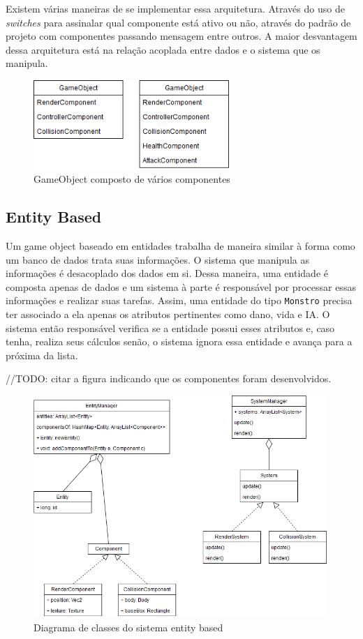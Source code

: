 \documentclass[12pt, 
openright, 
oneside, 
a4paper,    
brazil]{facom-ufu-abntex2}
\begin{document}
Existem várias maneiras de se implementar essa arquitetura. Através do uso de \textit{switches} para assinalar qual componente está ativo ou não, através do padrão de projeto com componentes passando mensagem entre outros. A maior desvantagem dessa arquitetura está na relação acoplada entre  dados e o sistema que os manipula.

\begin{figure}[H]
	\centering
	\includegraphics[width=20em]{imagens/componentBased.png}
	\caption{GameObject composto de vários componentes}
\end{figure}


\subsection{Entity Based}
Um game object baseado em entidades trabalha de maneira similar à forma como um banco de dados trata suas informações. O sistema que manipula as informações é desacoplado dos dados em si. Dessa maneira, uma entidade é composta apenas de dados e um sistema à parte é responsável por processar essas informações e realizar suas tarefas.
Assim, uma entidade do tipo \texttt{Monstro} precisa ter associado a ela apenas os atributos pertinentes como dano, vida e IA. O sistema então responsável verifica se a entidade possui esses atributos e, caso tenha, realiza seus cálculos senão, o sistema ignora essa entidade e avança para a próxima da lista.

//TODO: citar a figura indicando que os componentes foram desenvolvidos.


\begin{figure}[H]
	\centering
	\includegraphics[width=30em]{imagens/entityDiagram.png}
	\caption{Diagrama de classes do sistema entity based}
\end{figure}
\end{document}
